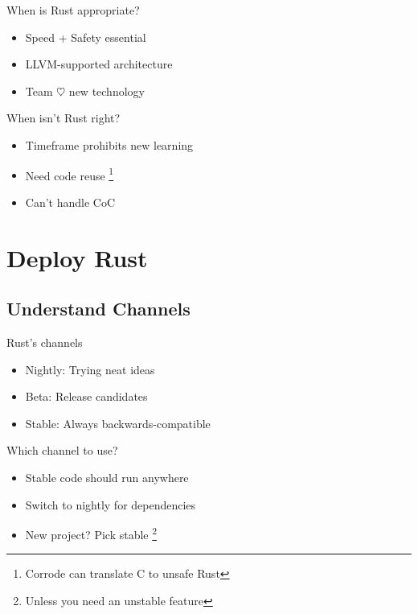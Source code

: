 \documentclass[xcolor={svgnames},hyperref]{beamer}
\begin{document}
    \begin{frame}
        When is Rust appropriate?
        \begin{itemize}
            \item Speed + Safety essential
            \item LLVM-supported architecture
            \item Team $\heartsuit$ new technology
        \end{itemize}
    \end{frame}

    \begin{frame}
        When isn't Rust right?
        \begin{itemize}
            \item Timeframe prohibits new learning
            \item Need code reuse \footnote{Corrode can translate C to unsafe Rust}
            \item Can't handle CoC
        \end{itemize}
    \end{frame}


\section{Deploy Rust}

    \subsection{Understand Channels}

    \begin{frame}
        Rust's channels
        \begin{itemize}
            \item Nightly: Trying neat ideas
            \item Beta: Release candidates
            \item Stable: Always backwards-compatible
        \end{itemize}
    \end{frame}

    \begin{frame}
        Which channel to use?
        \begin{itemize}
            \item Stable code should run anywhere
            \item Switch to nightly for dependencies
            \item New project? Pick stable \footnote{Unless you need an
                  unstable feature}
        \end{itemize}
    \end{frame}
\end{document}
